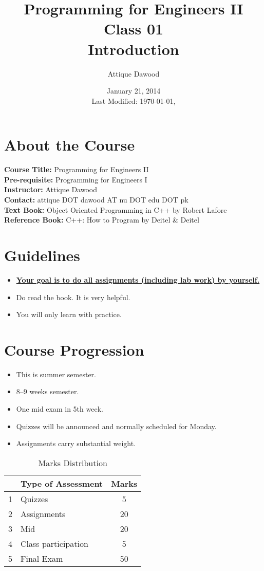 \documentclass[12pt,a4paper]{article}
\title{\vspace{-2cm}Programming for Engineers II\\Class 01\\Introduction}
\author{Attique Dawood}
\date{January 21, 2014\\[0.2cm] Last Modified: \today, \currenttime}
\begin{document}
\maketitle
\section{About the Course}
\textbf{Course Title:} Programming for Engineers II\\
\textbf{Pre-requisite:} Programming for Engineers I\\
\textbf{Instructor:} Attique Dawood\\
\textbf{Contact:} attique DOT dawood AT nu DOT edu DOT pk\\
\textbf{Text Book:} Object Oriented Programming in C++ by Robert Lafore\\
\textbf{Reference Book:} C++: How to Program by Deitel \& Deitel\\
\section{Guidelines}
\begin{itemize}
\item \textbf{\underline{Your goal is to do all assignments (including lab work) by yourself.}}
\item Do read the book. It is very helpful.
\item You will only learn with practice.
\end{itemize}
\section{Course Progression}
\begin{itemize}
\item This is summer semester.
\item 8--9 weeks semester.
\item One mid exam in 5th week.
\item Quizzes will be announced and normally scheduled for Monday.
\item Assignments carry substantial weight.
\end{itemize}
\begin{table}[H]
\begin{center}
\vspace{0.3cm}
	\begin{tabular}{llc}
	\hline \hline
		\rule{0pt}{2.6ex} & \textbf{Type of Assessment} & \textbf{Marks}\\
		\hline
		1 \rule{0pt}{2.6ex} & Quizzes & 5\\
		2 & Assignments& 20\\
		3 & Mid&20\\
		4 & Class participation & 5\\
		5 & Final Exam & 50\\
	\hline \hline
	\end{tabular}
\end{center}
\label{Marks Distribution}
\caption{Marks Distribution}
\end{table}
\end{document}
